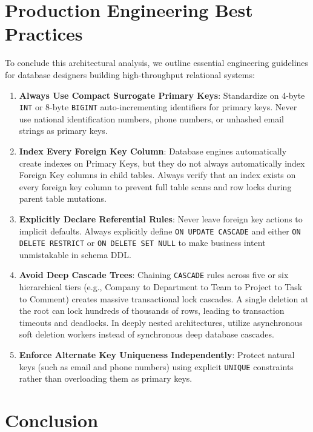 \documentclass[10pt,journal,compsoc,onecolumn]{IEEEtran}
\begin{document}
\section{Production Engineering Best Practices}
\label{sec:best_practices}

To conclude this architectural analysis, we outline essential engineering guidelines for database designers building high-throughput relational systems:

\begin{enumerate}
    \item \textbf{Always Use Compact Surrogate Primary Keys}: Standardize on 4-byte \texttt{INT} or 8-byte \texttt{BIGINT} auto-incrementing identifiers for primary keys. Never use national identification numbers, phone numbers, or unhashed email strings as primary keys.
    \item \textbf{Index Every Foreign Key Column}: Database engines automatically create indexes on Primary Keys, but they do not always automatically index Foreign Key columns in child tables. Always verify that an index exists on every foreign key column to prevent full table scans and row locks during parent table mutations.
    \item \textbf{Explicitly Declare Referential Rules}: Never leave foreign key actions to implicit defaults. Always explicitly define \texttt{ON UPDATE CASCADE} and either \texttt{ON DELETE RESTRICT} or \texttt{ON DELETE SET NULL} to make business intent unmistakable in schema DDL.
    \item \textbf{Avoid Deep Cascade Trees}: Chaining \texttt{CASCADE} rules across five or six hierarchical tiers (e.g., Company to Department to Team to Project to Task to Comment) creates massive transactional lock cascades. A single deletion at the root can lock hundreds of thousands of rows, leading to transaction timeouts and deadlocks. In deeply nested architectures, utilize asynchronous soft deletion workers instead of synchronous deep database cascades.
    \item \textbf{Enforce Alternate Key Uniqueness Independently}: Protect natural keys (such as email and phone numbers) using explicit \texttt{UNIQUE} constraints rather than overloading them as primary keys.
\end{enumerate}

\section{Conclusion}
\label{sec:conclusion}
\end{document}

